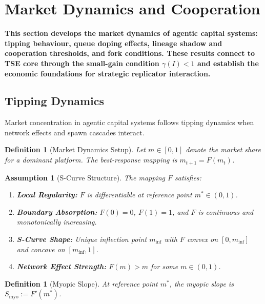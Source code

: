 \documentclass[12pt]{article}
\newtheorem{definition}[theorem]{Definition}
\newtheorem{assumption}[theorem]{Assumption}
\newcommand{\added}[1]{\textbf{#1}}
\begin{document}

\section{Market Dynamics and Cooperation}
\label{sec:market-dynamics}

\added{\textbf{This section develops the market dynamics of agentic capital systems: tipping behaviour, queue doping effects, lineage shadow and cooperation thresholds, and fork conditions. These results connect to TSE core through the small-gain condition $\gamma(I) < 1$ and establish the economic foundations for strategic replicator interaction.}}

\subsection{Tipping Dynamics}

Market concentration in agentic capital systems follows tipping dynamics when network effects and spawn cascades interact.

\begin{definition}[Market Dynamics Setup]
Let $m \in [0, 1]$ denote the market share for a dominant platform. The best-response mapping is $m_{t+1} = F(m_t)$.
\end{definition}

\begin{assumption}[S-Curve Structure]
\label{ass:s-curve}
The mapping $F$ satisfies:
\begin{enumerate}
    \item \textbf{Local Regularity:} $F$ is differentiable at reference point $m^* \in (0, 1)$.
    \item \textbf{Boundary Absorption:} $F(0) = 0$, $F(1) = 1$, and $F$ is continuous and monotonically increasing.
    \item \textbf{S-Curve Shape:} Unique inflection point $m_{\inf}$ with $F$ convex on $[0, m_{\inf}]$ and concave on $[m_{\inf}, 1]$.
    \item \textbf{Network Effect Strength:} $F(m) > m$ for some $m \in (0, 1)$.
\end{enumerate}
\end{assumption}

\begin{definition}[Myopic Slope]
At reference point $m^*$, the \emph{myopic slope} is $S_{\mathrm{myo}} := F'(m^*)$.
\end{definition}
\end{document}
